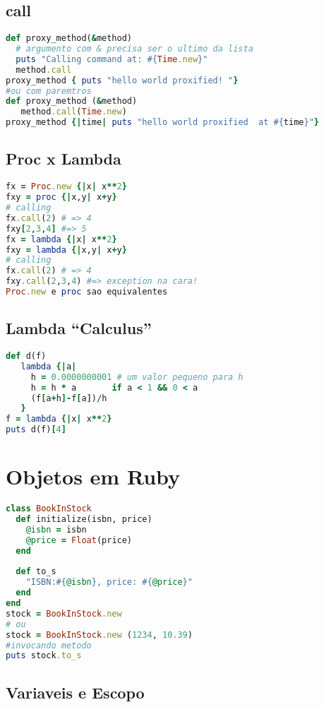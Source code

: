 \documentclass[serif,mathserif]{article}
\begin{document}
\subsection{call}
\begin{lstlisting}[language=ruby]
def proxy_method(&method)
  # argumento com & precisa ser o ultimo da lista
  puts "Calling command at: #{Time.new}"
  method.call
proxy_method { puts "hello world proxified! "}
#ou com paremtros
def proxy_method (&method)
   method.call(Time.new)
proxy_method {|time| puts "hello world proxified  at #{time}"}
\end{lstlisting}

\subsection{Proc x Lambda}
\begin{lstlisting}[language=ruby]
fx = Proc.new {|x| x**2}
fxy = proc {|x,y| x+y}
# calling
fx.call(2) # => 4
fxy[2,3,4] #=> 5
fx = lambda {|x| x**2}
fxy = lambda {|x,y| x+y}
# calling
fx.call(2) # => 4
fxy.call(2,3,4) #=> exception na cara!
Proc.new e proc sao equivalentes
\end{lstlisting}


\subsection{Lambda ``Calculus''}

\begin{lstlisting}[language=ruby, caption="Derivada em Ruby"]
def d(f)
   lambda {|a|
     h = 0.0000000001 # um valor pequeno para h
     h = h * a       if a < 1 && 0 < a
     (f[a+h]-f[a])/h
   }
f = lambda {|x| x**2}
puts d(f)[4]
\end{lstlisting}

\section{Objetos em Ruby}
\begin{lstlisting}[language=ruby]
class BookInStock
  def initialize(isbn, price)
    @isbn = isbn
    @price = Float(price)
  end
 
  def to_s
    "ISBN:#{@isbn}, price: #{@price}"
  end
end
stock = BookInStock.new
# ou
stock = BookInStock.new (1234, 10.39)
#invocando metodo
puts stock.to_s
\end{lstlisting}


\subsection{Variaveis e Escopo}
\end{document}
